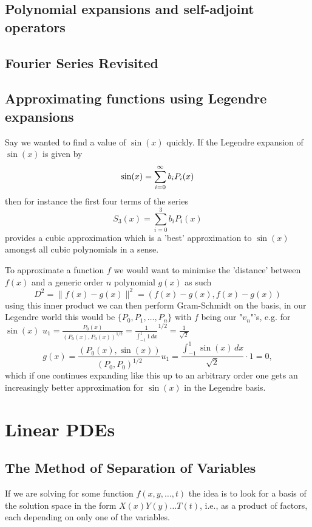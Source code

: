 \documentclass[10pt, a4paper]{article}
\begin{document}
\subsection{Polynomial expansions and self-adjoint operators}

\subsection{Fourier Series Revisited}

\subsection{Approximating functions using Legendre expansions}

Say we wanted to find a value of $\sin(x)$ quickly.
If the Legendre expansion of $\sin(x)$ is given by
\[
\sin(x) = \infsum[i = 0]b_iP_i(x)
\]
then for instance the first four terms of the series
\[
S_3(x) = \sum_{i = 0}^{3}b_iP_i(x)
\]
provides a cubic approximation which is a 'best' approximation to $\sin(x)$ amongst all cubic polynomials in a sense.

To approximate a function $f$ we would want to minimise the 'distance' between $f(x)$ and a generic order $n$ polynomial $g(x)$ as such
\[
D ^ 2 = \|f(x) - g(x)\| ^ 2 = (f(x) - g(x), f(x) - g(x))
\]
using this inner product we can then perform Gram-Schmidt on the basis,
in our Legendre world this would be $\{P_0, P_1, \dotsc, P_n\}$ with $f$ being our "$v_n$"'s,
e.g. for $\sin(x)$
$u_1 = \frac{P_0(x)}{(P_0(x), P_0(x)) ^ {1 / 2}} = \frac{1}{\int_{-1}^{1}1\,dx} ^ {1 / 2} = \frac{1}{\sqrt{2}}$
\[
g(x) = \frac{(P_0(x), \sin(x))}{(P_0, P_0) ^ {1 / 2}}u_1 = \frac{\int_{-1}^{1}\sin(x)\,dx}{\sqrt{2}}\cdot 1 = 0,
\]
which if one continues expanding like this up to an arbitrary order one gets an increasingly better approximation for $\sin(x)$ in the Legendre basis.

\newpage

\section{Linear PDEs}

\subsection{The Method of Separation of Variables}

If we are solving for some function $f(x, y, \dotsc, t)$ the idea is to look for a basis of the solution space in the form $X(x)Y(y)\dotsc T(t)$,
i.e.,
as a product of factors,
each depending on only one of the variables.
\end{document}
